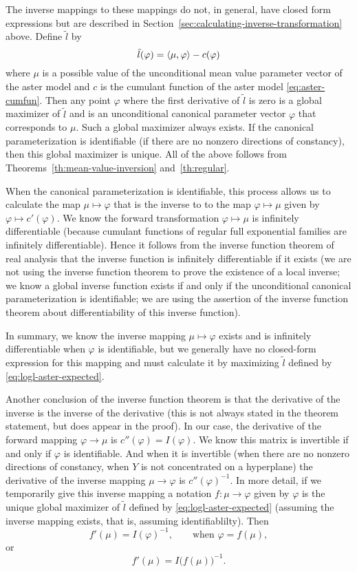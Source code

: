 The inverse mappings to these mappings do not, in general,
have closed form expressions
but are described in Section~\ref{sec:calculating-inverse-transformation}
above.  Define $\tilde{l}$ by
\begin{equation} \label{eq:logl-aster-expected}
   \tilde{l}(\varphi) = \langle \mu, \varphi \rangle - c(\varphi)
\end{equation}
where $\mu$ is a possible value of the unconditional mean value parameter
vector of the aster model and $c$ is the cumulant function of the aster
model \eqref{eq:aster-cumfun}.  Then any point $\varphi$
where the first derivative of $\tilde{l}$ is zero is a global maximizer
of $\tilde{l}$ and is an unconditional canonical parameter vector $\varphi$
that corresponds to $\mu$.  Such a global maximizer always exists.
If the canonical parameterization is identifiable (if there are
no nonzero directions of constancy), then this global maximizer is unique.
All of the above follows from Theorems~\ref{th:mean-value-inversion}
and~\ref{th:regular}.

When the canonical parameterization is identifiable, this process allows
us to calculate the map $\mu \mapsto \varphi$ that is the inverse to
to the map $\varphi \mapsto \mu$ given by $\varphi \mapsto c'(\varphi)$.
We know the forward transformation $\varphi \mapsto \mu$
is infinitely differentiable (because cumulant functions of regular
full exponential families are infinitely differentiable).
Hence it follows from the inverse function theorem of real analysis
\citep[Theorem~8.27]{browder} that the inverse function is infinitely
differentiable if it exists (we are not using the inverse function theorem
to prove the existence of a local inverse; we know a global inverse function
exists if and only if the unconditional canonical parameterization
is identifiable; we are using the assertion of the inverse function theorem
about differentiability of this inverse function).

In summary, we know the inverse mapping $\mu \mapsto \varphi$ exists
and is infinitely differentiable when $\varphi$ is identifiable,
but we generally have no closed-form expression for this mapping and
must calculate it by maximizing $\tilde{l}$ defined
by \eqref{eq:logl-aster-expected}.

Another conclusion of the inverse function theorem is that the derivative
of the inverse is the inverse of the derivative (this is not always
stated in the theorem statement, but does appear in the proof).
In our case, the derivative of the forward mapping $\varphi \to \mu$
is $c''(\varphi) = I(\varphi)$.  We know this matrix is invertible
if and only if $\varphi$ is identifiable.  And when it is invertible
(when there are no nonzero directions of constancy, when $Y$ is not
concentrated on a hyperplane) the derivative of the inverse mapping
$\mu \to \varphi$ is $c''(\varphi)^{- 1}$.
In more detail, if we temporarily give this inverse mapping a notation
$f : \mu \to \varphi$ given by $\varphi$ is the unique global maximizer
of $\tilde{l}$ defined by \eqref{eq:logl-aster-expected}
(assuming the inverse mapping exists, that is, assuming identifiablilty).
Then
$$
   f'(\mu) = I(\varphi)^{-1}, \qquad \text{when $\varphi = f(\mu)$},
$$
or
$$
   f'(\mu) = I\bigl(f(\mu)\bigr)^{-1}.
$$

